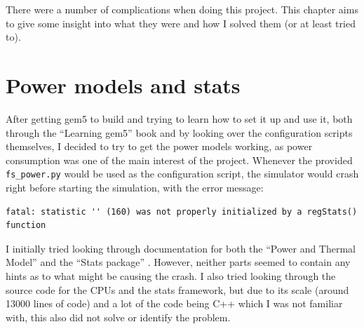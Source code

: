 There were a number of complications when doing this project. This chapter aims 
to give some insight into what they were and how I solved them (or at least 
tried to).

\section{Power models and stats}
After getting gem5 to build and trying to learn how to set it up and use it, 
both through the ``Learning gem5'' book \cite{lowe-power_learning_2019} and by 
looking over the configuration scripts themselves, I decided to try to get the 
power models working, as power consumption was one of the main interest of the 
project. Whenever the provided \texttt{fs\_power.py} would be used as the 
configuration script, the simulator would crash right before starting the 
simulation, with the error message:
\begin{lstlisting}[basicstyle=\sffamily\footnotesize]
fatal: statistic '' (160) was not properly initialized by a regStats() function
\end{lstlisting}

I initially tried looking through documentation for both the ``Power and Thermal
Model'' \cite{noauthor_gem5_nodate-1} and the ``Stats package'' 
\cite{noauthor_gem5_nodate-3}. However, neither parts seemed to contain any 
hints as to what might be causing the crash. I also tried looking through the 
source code for the CPUs and the stats framework, but due to its scale (around 
13000 lines of code) and a lot of the code being C++ which I was not familiar 
with, this also did not solve or identify the problem.

